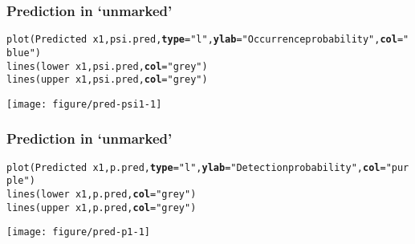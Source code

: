 \documentclass[color=usenames,dvipsnames]{beamer}\usepackage[]{graphicx}\usepackage[]{color}
\makeatletter
\newcommand{\hlstr}[1]{\textcolor[rgb]{0.749,0.012,0.012}{#1}}%
\newcommand{\hlopt}[1]{\textcolor[rgb]{0,0,0}{#1}}%
\newcommand{\hlstd}[1]{\textcolor[rgb]{0,0,0}{#1}}%
\newcommand{\hlkwc}[1]{\textcolor[rgb]{0,0,0}{\textbf{#1}}}%
\newcommand{\hlkwd}[1]{\textcolor[rgb]{0.004,0.004,0.506}{#1}}%
\newenvironment{kframe}{%
 \def\at@end@of@kframe{}%
 \ifinner\ifhmode%
  \def\at@end@of@kframe{\end{minipage}}%
  \begin{minipage}{\columnwidth}%
 \fi\fi%
 \def\FrameCommand##1{\hskip\@totalleftmargin \hskip-\fboxsep
 \colorbox{shadecolor}{##1}\hskip-\fboxsep
     \hskip-\linewidth \hskip-\@totalleftmargin \hskip\columnwidth}%
 \MakeFramed {\advance\hsize-\width
   \@totalleftmargin\z@ \linewidth\hsize
   \@setminipage}}%
 {\par\unskip\endMakeFramed%
 \at@end@of@kframe}
\newenvironment{knitrout}{}{} %
\makeatother
\begin{document}
\begin{frame}[fragile]
  \frametitle{Prediction in `unmarked'}
\begin{knitrout}\tiny
{}\color{fgcolor}\begin{kframe}
\begin{alltt}
\hlkwd{plot}\hlstd{(Predicted} \hlopt{~} \hlstd{x1, psi.pred,} \hlkwc{type}\hlstd{=}\hlstr{"l"}\hlstd{,} \hlkwc{ylab}\hlstd{=}\hlstr{"Occurrence probability"}\hlstd{,} \hlkwc{col}\hlstd{=}\hlstr{"blue"}\hlstd{)}
\hlkwd{lines}\hlstd{(lower} \hlopt{~} \hlstd{x1, psi.pred,} \hlkwc{col}\hlstd{=}\hlstr{"grey"}\hlstd{)}
\hlkwd{lines}\hlstd{(upper} \hlopt{~} \hlstd{x1, psi.pred,} \hlkwc{col}\hlstd{=}\hlstr{"grey"}\hlstd{)}
\end{alltt}
\end{kframe}

{\centering \texttt{[image: figure/pred-psi1-1]} 

}



\end{knitrout}
\end{frame}




\begin{frame}[fragile]
  \frametitle{Prediction in `unmarked'}
\begin{knitrout}\tiny
{}\color{fgcolor}\begin{kframe}
\begin{alltt}
\hlkwd{plot}\hlstd{(Predicted} \hlopt{~} \hlstd{x1, p.pred,} \hlkwc{type}\hlstd{=}\hlstr{"l"}\hlstd{,} \hlkwc{ylab}\hlstd{=}\hlstr{"Detection probability"}\hlstd{,} \hlkwc{col}\hlstd{=}\hlstr{"purple"}\hlstd{)}
\hlkwd{lines}\hlstd{(lower} \hlopt{~} \hlstd{x1, p.pred,} \hlkwc{col}\hlstd{=}\hlstr{"grey"}\hlstd{)}
\hlkwd{lines}\hlstd{(upper} \hlopt{~} \hlstd{x1, p.pred,} \hlkwc{col}\hlstd{=}\hlstr{"grey"}\hlstd{)}
\end{alltt}
\end{kframe}

{\centering \texttt{[image: figure/pred-p1-1]} 

}



\end{knitrout}
\end{frame}


\end{document}
